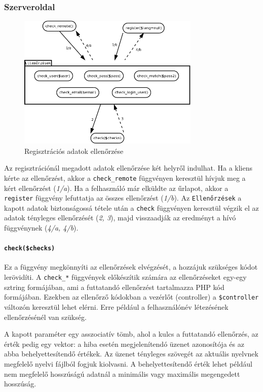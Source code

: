 \documentclass[12pt,a4paper,twoside]{article}
\begin{document}
\subsubsection{Szerveroldal}

\begin{figure}[htp]
  \centering
  \includegraphics[width=328px]{reg_check.png}
  \caption{Regisztrációs adatok ellenőrzése}\label{fig:reg_check}
\end{figure}

Az regisztrációnál megadott adatok ellenőrzése két helyről indulhat. Ha a kliens
kérte az ellenőrzést, akkor a \texttt{check\_remote} függvényen keresztül hívjuk
meg a kért ellenőrzést (\emph{1/a}). Ha a felhasználó már elküldte az űrlapot,
akkor a \texttt{register} függvény lefuttatja az összes ellenőrzést
(\emph{1/b}). Az \texttt{Ellenőrzések} a kapott adatok biztonságossá tétele után a
\texttt{check} függvényen keresztül végzik el az adatok tényleges ellenőrzését
(\emph{2, 3}), majd visszaadják az eredményt a hívó függvénynek (\emph{4/a, 4/b}).


\paragraph{\texttt{check(\$checks)}}
Ez a függvény megkönnyíti az ellenőrzések elvégzését, a hozzájuk szükséges kódot
lerövidíti. A \texttt{check\_*} függvények előkészítik számára az ellenőrzéseket
egy-egy sztring formájában, ami a futtatandó ellenőrzést tartalmazza PHP kód
formájában. Ezekben az ellenőrző kódokban a vezérlőt (controller) a
\texttt{\$controller} változón keresztül lehet elérni. Erre például a
felhasználónév létezésének ellenőrzésénél van szükség.

A kapott paraméter egy asszociatív tömb, ahol a kulcs a futtatandó ellenőrzés,
az érték pedig egy vektor: a hiba esetén megjelenítendó üzenet azonosítója és
az abba behelyettesítendő értékek. Az üzenet tényleges szövegét az aktuális
nyelvnek megfelelő nyelvi fájlból fogjuk kiolvasni. A behelyettesítendő érték
lehet például nem megfelelő hosszúságú adatnál a minimális vagy maximális
megengedett hosszúság.
\end{document}
